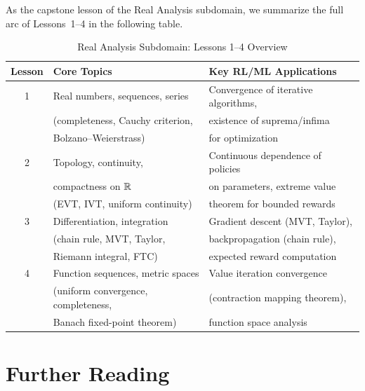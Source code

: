 \documentclass[11pt,a4paper]{article}
\begin{document}
\bigskip

As the capstone lesson of the Real Analysis subdomain, we summarize the
full arc of Lessons~1--4 in the following table.

\begin{table}[h]
\centering
\caption{Real Analysis Subdomain: Lessons 1--4 Overview}
\label{tab:subdomain_summary}
\begin{tabular}{@{} c l l @{}}
\toprule
\textbf{Lesson} & \textbf{Core Topics} & \textbf{Key RL/ML Applications} \\
\midrule
1 & Real numbers, sequences, series &
  Convergence of iterative algorithms, \\
  & (completeness, Cauchy criterion, &
  existence of suprema/infima \\
  & Bolzano--Weierstrass) & for optimization \\
\midrule
2 & Topology, continuity, &
  Continuous dependence of policies \\
  & compactness on $\mathbb{R}$ &
  on parameters, extreme value \\
  & (EVT, IVT, uniform continuity) &
  theorem for bounded rewards \\
\midrule
3 & Differentiation, integration &
  Gradient descent (MVT, Taylor), \\
  & (chain rule, MVT, Taylor, &
  backpropagation (chain rule), \\
  & Riemann integral, FTC) &
  expected reward computation \\
\midrule
4 & Function sequences, metric spaces &
  Value iteration convergence \\
  & (uniform convergence, completeness, &
  (contraction mapping theorem), \\
  & Banach fixed-point theorem) &
  function space analysis \\
\bottomrule
\end{tabular}
\end{table}

\section{Further Reading}
\label{sec:further_reading}
\end{document}
